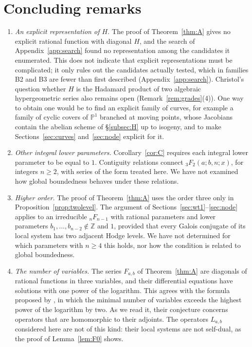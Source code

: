 \documentclass[11pt]{amsart}
\theoremstyle{definition}
\theoremstyle{remark}
\numberwithin{equation}{section}
\newcommand{\Z}{\mathbb{Z}}
\newcommand{\PP}{\mathbb{P}}
\newcommand{\Fab}{F_{a,b}}
\begin{document}
\section{Concluding remarks}\label{sec:remarks}

\begin{enumerate}[label=(\arabic*),leftmargin=2em]
\item \emph{An explicit representation of $H$.} The proof of Theorem~\ref{thm:A} gives no explicit rational function with diagonal $H$, and the search of Appendix~\ref{app:search} found no representation among the candidates it enumerated. This does not indicate that explicit representations must be complicated; it only rules out the candidates actually tested, which in families B2 and B3 are fewer than first described (Appendix~\ref{app:search}). Christol's question whether $H$ is the Hadamard product of two algebraic hypergeometric series also remains open (Remark~\ref{rem:grades}(4)). One way to obtain one would be to find an explicit family of curves, for example a family of cyclic covers of $\PP^1$ branched at moving points, whose Jacobians contain the abelian scheme of \S\ref{subsec:H} up to isogeny, and to make Sections~\ref{sec:curves} and~\ref{sec:node} explicit for it.
\item \emph{Other integral lower parameters.} Corollary~\ref{cor:C} requires each integral lower parameter to be equal to $1$. Contiguity relations connect ${}_3F_2(a;b,n;x)$, for integers $n\ge2$, with series of the form treated here. We have not examined how global boundedness behaves under these relations.
\item \emph{Higher order.} The proof of Theorem~\ref{thm:A} uses the order three only in Proposition~\ref{prop:twolevel}. The argument of Sections~\ref{sec:wt1}--\ref{sec:node} applies to an irreducible ${}_nF_{n-1}$ with rational parameters and lower parameters $b_1,\dots,b_{n-2}\notin\Z$ and $1$, provided that every Galois conjugate of its local system has two adjacent Hodge levels. We have not determined for which parameters with $n\ge4$ this holds, nor how the condition is related to global boundedness.
\item \emph{The number of variables.} The series $\Fab$ of Theorem~\ref{thm:A} are diagonals of rational functions in three variables, and their differential equations have solutions with one power of the logarithm. This agrees with the formula proposed by \citet{HassaniMaillardZenine2025}, in which the minimal number of variables exceeds the highest power of the logarithm by two. As we read it, their conjecture concerns operators that are homomorphic to their adjoints. The operators $L_{a,b}$ considered here are not of this kind: their local systems are not self-dual, as the proof of Lemma~\ref{lem:F0} shows.

\end{enumerate}
\end{document}
